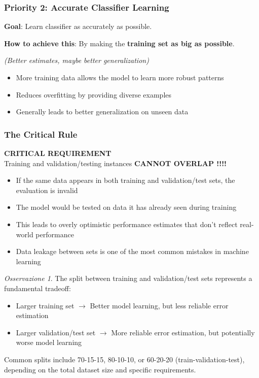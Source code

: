 \documentclass[11pt,a4paper]{article}
\theoremstyle{definition}
\theoremstyle{plain}
\theoremstyle{remark}
\newtheorem*{observation}{Osservazione}
\begin{document}
\subsubsection{Priority 2: Accurate Classifier Learning}

\textbf{Goal}: Learn classifier as accurately as possible.

\textbf{How to achieve this}: By making the \textbf{training set as big as possible}.

\textit{(Better estimates, maybe better generalization)}

\begin{itemize}
    \item More training data allows the model to learn more robust patterns
    \item Reduces overfitting by providing diverse examples
    \item Generally leads to better generalization on unseen data
\end{itemize}

\subsubsection{The Critical Rule}

\begin{center}
\colorbox{red!20}{\parbox{0.9\textwidth}{
\centering
\textbf{CRITICAL REQUIREMENT}\\[0.3cm]
Training and validation/testing instances \textbf{CANNOT OVERLAP !!!!}
}}
\end{center}

\begin{itemize}
    \item If the same data appears in both training and validation/test sets, the evaluation is invalid
    \item The model would be tested on data it has already seen during training
    \item This leads to overly optimistic performance estimates that don't reflect real-world performance
    \item Data leakage between sets is one of the most common mistakes in machine learning
\end{itemize}

\begin{observation}
The split between training and validation/test sets represents a fundamental tradeoff:
\begin{itemize}
    \item Larger training set $\rightarrow$ Better model learning, but less reliable error estimation
    \item Larger validation/test set $\rightarrow$ More reliable error estimation, but potentially worse model learning
\end{itemize}

Common splits include 70-15-15, 80-10-10, or 60-20-20 (train-validation-test), depending on the total dataset size and specific requirements.
\end{observation}
\end{document}

